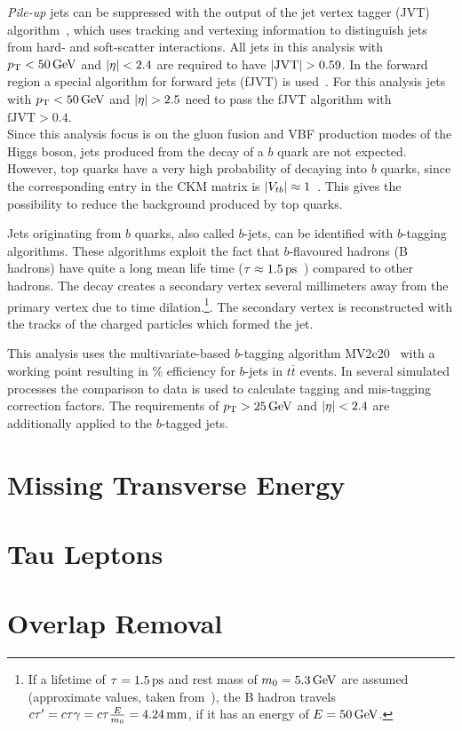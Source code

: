 \emph{Pile-up} jets can be suppressed with the output of the jet vertex tagger (JVT) algorithm~\cite{PERF-2014-03}, which
uses tracking and vertexing information to distinguish jets from hard- and soft-scatter interactions.
All jets in this analysis with $\pt < \unit[50]{GeV}$ and $\left|\eta\right| < 2.4$ are required to have $\left|\text{JVT}\right| > 0.59$.
In the forward region a special algorithm for forward jets (fJVT) is used~\cite{ATL-PHYS-PUB-2015-034}.
For this analysis jets with $\pt < \unit[50]{GeV}$ and $\left|\eta\right| > 2.5$ need to pass the fJVT algorithm with
$\text{fJVT} > 0.4$.
\\[\baselineskip]
Since this analysis focus is on the gluon fusion and VBF production modes of the Higgs boson, jets produced from
the decay of a $b$ quark are not expected. However, top quarks have a very high probability of decaying into $b$ quarks,
since the corresponding entry in the CKM matrix is $\left|V_{tb}\right| \approx 1$~\cite{PDG}.
This gives the possibility to reduce the background produced by top quarks.

Jets originating from $b$ quarks, also called $b$-jets, can be identified with $b$-tagging algorithms.
These algorithms exploit the fact that $b$-flavoured hadrons (B hadrons) have quite a long mean life time
($\tau \approx \unit[1.5]{ps}$~\cite{PDG}) compared to other hadrons.
The decay creates a secondary vertex several millimeters away from the primary vertex due to time
dilation.\footnote{If a lifetime of $\tau = \unit[1.5]{ps}$ and rest mass of $m_0 = \unit[5.3]{GeV}$ are assumed (approximate values, taken from~\cite{PDG}),
the B hadron travels $c\tau' = c \tau \gamma = c \tau \frac{E}{m_0} = \unit[4.24]{mm}$, if it has an energy of $E = \unit[50]{GeV}$.}.
The secondary vertex is reconstructed with the tracks of the charged particles which formed the jet.

This analysis uses the multivariate-based $b$-tagging algorithm MV2c20~\cite{PERF-2012-04,ATL-PHYS-PUB-2016-012} with
a working point resulting in \unit[85]{\%} efficiency for $b$-jets in $t\overline{t}$ events. In several simulated processes
the comparison to data is used to calculate tagging and mis-tagging correction factors.
The requirements of $\pt > \unit[25]{GeV}$ and $\left|\eta\right| < 2.4$ are additionally applied to the $b$-tagged jets.

\section{Missing Transverse Energy}\label{sec:object_selection:missing_transverse_energy}

\section{Tau Leptons}\label{sec:object_selection:tau_leptons}

\section{Overlap Removal}\label{sec:object_selection:overlap_removal}


